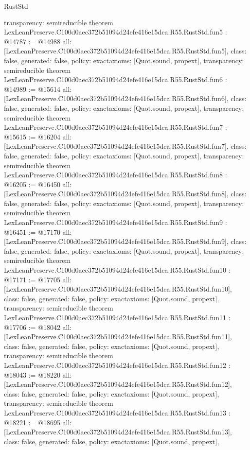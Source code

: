 \begin{lexlean}{RustStd}
\begin{coremodule}
{  transparency: semireducible
}
theorem LexLeanPreserve.C100d0aec372b51094d24efe416e15dca.R55.RustStd.fun5 : @14787 := @14988 {
  all: [LexLeanPreserve.C100d0aec372b51094d24efe416e15dca.R55.RustStd.fun5],
  class: false,
  generated: false,
  policy: exact{axioms: [Quot.sound, propext]},
  transparency: semireducible
}
theorem LexLeanPreserve.C100d0aec372b51094d24efe416e15dca.R55.RustStd.fun6 : @14989 := @15614 {
  all: [LexLeanPreserve.C100d0aec372b51094d24efe416e15dca.R55.RustStd.fun6],
  class: false,
  generated: false,
  policy: exact{axioms: [Quot.sound, propext]},
  transparency: semireducible
}
theorem LexLeanPreserve.C100d0aec372b51094d24efe416e15dca.R55.RustStd.fun7 : @15615 := @16204 {
  all: [LexLeanPreserve.C100d0aec372b51094d24efe416e15dca.R55.RustStd.fun7],
  class: false,
  generated: false,
  policy: exact{axioms: [Quot.sound, propext]},
  transparency: semireducible
}
theorem LexLeanPreserve.C100d0aec372b51094d24efe416e15dca.R55.RustStd.fun8 : @16205 := @16450 {
  all: [LexLeanPreserve.C100d0aec372b51094d24efe416e15dca.R55.RustStd.fun8],
  class: false,
  generated: false,
  policy: exact{axioms: [Quot.sound, propext]},
  transparency: semireducible
}
theorem LexLeanPreserve.C100d0aec372b51094d24efe416e15dca.R55.RustStd.fun9 : @16451 := @17170 {
  all: [LexLeanPreserve.C100d0aec372b51094d24efe416e15dca.R55.RustStd.fun9],
  class: false,
  generated: false,
  policy: exact{axioms: [Quot.sound, propext]},
  transparency: semireducible
}
theorem LexLeanPreserve.C100d0aec372b51094d24efe416e15dca.R55.RustStd.fun10 : @17171 := @17705 {
  all: [LexLeanPreserve.C100d0aec372b51094d24efe416e15dca.R55.RustStd.fun10],
  class: false,
  generated: false,
  policy: exact{axioms: [Quot.sound, propext]},
  transparency: semireducible
}
theorem LexLeanPreserve.C100d0aec372b51094d24efe416e15dca.R55.RustStd.fun11 : @17706 := @18042 {
  all: [LexLeanPreserve.C100d0aec372b51094d24efe416e15dca.R55.RustStd.fun11],
  class: false,
  generated: false,
  policy: exact{axioms: [Quot.sound, propext]},
  transparency: semireducible
}
theorem LexLeanPreserve.C100d0aec372b51094d24efe416e15dca.R55.RustStd.fun12 : @18043 := @18220 {
  all: [LexLeanPreserve.C100d0aec372b51094d24efe416e15dca.R55.RustStd.fun12],
  class: false,
  generated: false,
  policy: exact{axioms: [Quot.sound, propext]},
  transparency: semireducible
}
theorem LexLeanPreserve.C100d0aec372b51094d24efe416e15dca.R55.RustStd.fun13 : @18221 := @18695 {
  all: [LexLeanPreserve.C100d0aec372b51094d24efe416e15dca.R55.RustStd.fun13],
  class: false,
  generated: false,
  policy: exact{axioms: [Quot.sound, propext]},
}
\end{coremodule}
\end{lexlean}
